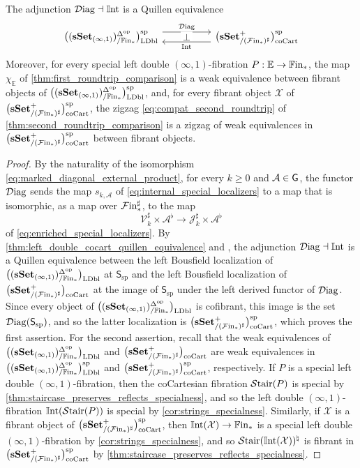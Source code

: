 \documentclass[10pt,reqno]{amsart}
\begin{document}
\begin{theorem}
\label{thm:special_quillen_equivalence}
The adjunction $\Diag\dashv\Int$ is a Quillen equivalence
\[\adjunction{\ldblfibsp}{\cocartsp}{\Diag}{\Int}\]
Moreover, for every special left double $(\infty,1)$-fibration
$P:\mathbb E\to\bisimFin$, the map $\chi_{\mathbb E}$ of
\cref{thm:first_roundtrip_comparison} is a weak equivalence between
fibrant objects of $\ldblfibsp$, and, for every fibrant object
$\mathcal X$ of $\cocartsp$, the zigzag
\eqref{eq:compat_second_roundtrip} of
\cref{thm:second_roundtrip_comparison} is a zigzag of weak
equivalences in $\cocartsp$ between fibrant objects.
\end{theorem}

\begin{proof}
By the naturality of the isomorphism
\eqref{eq:marked_diagonal_external_product}, for every $k\geq0$ and
$\mathcal A\in\HGen$, the functor $\Diag$ sends the map
$s_{k,\mathcal A}$ of \eqref{eq:internal_special_localizers} to a
map that is isomorphic, as a map over $\simFin^\sharp$, to the map
\[
\mathcal V_k^\sharp\times \mathcal A^\flat\longrightarrow
 \mathcal J_k^\sharp\times \mathcal A^\flat
\]
of \eqref{eq:enriched_special_localizers}. By
\cref{thm:left_double_cocart_quillen_equivalence} and
\cite[Theorem~3.3.20\textup{(1)}]{hirschhorn2003model}, the adjunction
$\Diag\dashv\Int$ is a Quillen equivalence between the left
Bousfield localization of $\ldblfib$ at $\mathsf S_{\mathrm{sp}}$
and the left Bousfield localization of $\cocart$ at the image of
$\mathsf S_{\mathrm{sp}}$ under the left derived functor of
$\Diag$. Since every object of $\ldblfib$ is cofibrant, this image
is the set $\Diag(\mathsf S_{\mathrm{sp}})$, and so the latter
localization is $\cocartsp$, which proves the first assertion. For
the second assertion, recall that the weak equivalences of
$\ldblfib$ and $\cocart$ are weak equivalences in $\ldblfibsp$
and $\cocartsp$, respectively. If $P$ is a special left double
$(\infty,1)$-fibration, then the coCartesian fibration $\Stair(P)$
is special by \cref{thm:staircase_preserves_reflects_specialness}, and
so the left double $(\infty,1)$-fibration $\Int(\Stair(P))$ is
special by \cref{cor:strings_specialness}. Similarly, if
$\mathcal X$ is a fibrant object of $\cocartsp$, then
$\Int(\mathcal X)\to\bisimFin$ is a special left double
$(\infty,1)$-fibration by \cref{cor:strings_specialness}, and so
$\Stair(\Int(\mathcal X))^\natural$ is fibrant in $\cocartsp$ by
\cref{thm:staircase_preserves_reflects_specialness}.
\end{proof}
\end{document}

